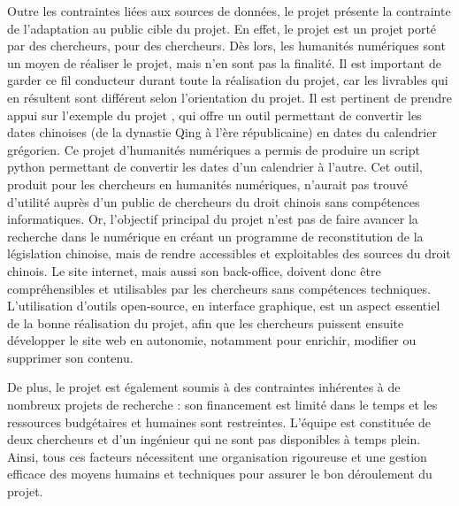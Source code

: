 Outre les contraintes liées aux sources de données, le projet présente la contrainte de l'adaptation au public cible du projet. En effet, le projet \COREL est un projet porté par des chercheurs, pour des chercheurs. Dès lors, les humanités numériques sont un moyen de réaliser le projet, mais n'en sont pas la finalité. Il est important de garder ce fil conducteur durant toute la réalisation du projet, car les livrables qui en résultent sont différent selon l'orientation du projet. Il est pertinent de prendre appui sur l'exemple du projet \calendar, qui offre un outil permettant de convertir les dates chinoises (de la dynastie Qing à l'ère républicaine) en dates du calendrier grégorien. Ce projet d'humanités numériques a permis de produire un script python permettant de convertir les dates d'un calendrier à l'autre. Cet outil, produit pour les chercheurs en humanités numériques, n'aurait pas trouvé d'utilité auprès d'un public de chercheurs du droit chinois sans compétences informatiques. Or, l'objectif principal du projet \COREL n'est pas de faire avancer la recherche dans le numérique en créant un programme de reconstitution de la législation chinoise, mais de rendre accessibles et exploitables des sources du droit chinois. Le site internet, mais aussi son back-office, doivent donc être compréhensibles et utilisables par les chercheurs sans compétences techniques. L'utilisation d'outils open-source, en interface graphique, est un aspect essentiel de la bonne réalisation du projet, afin que les chercheurs puissent ensuite développer le site web en autonomie, notamment pour enrichir, modifier ou supprimer son contenu. 

De plus, le projet \COREL est également soumis à des contraintes inhérentes à de nombreux projets de recherche : son financement est limité dans le temps et les ressources budgétaires et humaines sont restreintes. L'équipe est constituée de deux chercheurs et d'un ingénieur qui ne sont pas disponibles à temps plein. Ainsi, tous ces facteurs nécessitent une organisation rigoureuse et une gestion efficace des moyens humains et techniques pour assurer le bon déroulement du projet. 
